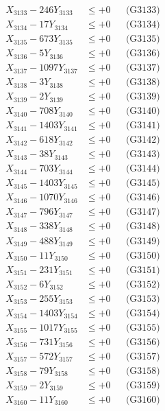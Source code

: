 \documentclass[a4paper,10pt]{article}
\begin{document}
{\begin{align}
X_{3133} - 246Y_{3133} &\leq +0 && \text{(G3133)} \\
X_{3134} - 17Y_{3134} &\leq +0 && \text{(G3134)} \\
X_{3135} - 673Y_{3135} &\leq +0 && \text{(G3135)} \\
X_{3136} - 5Y_{3136} &\leq +0 && \text{(G3136)} \\
X_{3137} - 1097Y_{3137} &\leq +0 && \text{(G3137)} \\
X_{3138} - 3Y_{3138} &\leq +0 && \text{(G3138)} \\
X_{3139} - 2Y_{3139} &\leq +0 && \text{(G3139)} \\
X_{3140} - 708Y_{3140} &\leq +0 && \text{(G3140)} \\
\allowbreak
X_{3141} - 1403Y_{3141} &\leq +0 && \text{(G3141)} \\
X_{3142} - 618Y_{3142} &\leq +0 && \text{(G3142)} \\
X_{3143} - 38Y_{3143} &\leq +0 && \text{(G3143)} \\
X_{3144} - 703Y_{3144} &\leq +0 && \text{(G3144)} \\
X_{3145} - 1403Y_{3145} &\leq +0 && \text{(G3145)} \\
X_{3146} - 1070Y_{3146} &\leq +0 && \text{(G3146)} \\
X_{3147} - 796Y_{3147} &\leq +0 && \text{(G3147)} \\
X_{3148} - 338Y_{3148} &\leq +0 && \text{(G3148)} \\
X_{3149} - 488Y_{3149} &\leq +0 && \text{(G3149)} \\
X_{3150} - 11Y_{3150} &\leq +0 && \text{(G3150)} \\
\allowbreak
X_{3151} - 231Y_{3151} &\leq +0 && \text{(G3151)} \\
X_{3152} - 6Y_{3152} &\leq +0 && \text{(G3152)} \\
X_{3153} - 255Y_{3153} &\leq +0 && \text{(G3153)} \\
X_{3154} - 1403Y_{3154} &\leq +0 && \text{(G3154)} \\
X_{3155} - 1017Y_{3155} &\leq +0 && \text{(G3155)} \\
X_{3156} - 731Y_{3156} &\leq +0 && \text{(G3156)} \\
X_{3157} - 572Y_{3157} &\leq +0 && \text{(G3157)} \\
X_{3158} - 79Y_{3158} &\leq +0 && \text{(G3158)} \\
X_{3159} - 2Y_{3159} &\leq +0 && \text{(G3159)} \\
X_{3160} - 11Y_{3160} &\leq +0 && \text{(G3160)} \\

\end{align}}
\end{document}
